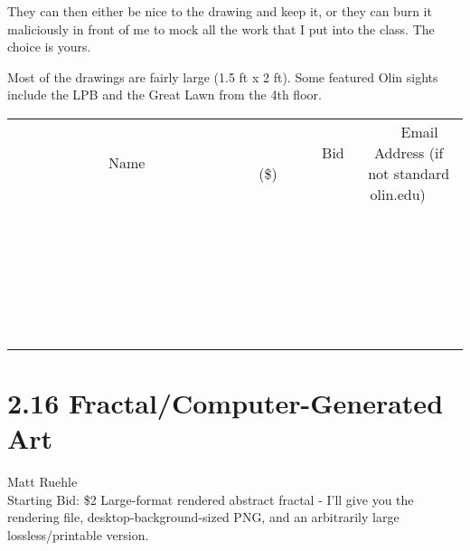 \documentclass[11pt]{article}
\begin{document}
They can then either be nice to the drawing and keep it, or they can burn it maliciously in front of me to mock all the work that I put into the class. The choice is yours.

Most of the drawings are fairly large (1.5 ft x 2 ft). Some featured Olin sights include the LPB and the Great Lawn from the 4th floor.
\\[6ex]
\begin{tabular}{c c c}
~~~~~~~~~~~~~Name~~~~~~~~~~~~~ & ~~~~~~~~~Bid (\$)~~~~~~~~~  & ~~~Email Address (if not standard olin.edu)~~~\\
 & & \\
\hline
 & & \\
\hline
 & & \\
\hline
 & & \\
\hline
 & & \\
\hline
 & & \\
\hline
 & & \\
\hline
 & & \\
\hline
 & & \\
\hline
 & & \\
\hline
 & & \\
\hline
 & & \\
\hline
 & & \\
\hline
 & & \\
\hline
 & & \\
\hline
 & & \\
\hline
 & & \\
\hline
 & & \\
\hline
 & & \\
\hline
 & & \\
\hline
 & & \\
\hline
 & & \\
\hline
 & & \\
\hline
 & & \\
\hline
 & & \\
\hline
 & & \\
\hline
\end{tabular}
\newpage
\section*{2.16 Fractal/Computer-Generated Art}
Matt Ruehle
\\
Starting Bid: \$2
\newline
Large-format rendered abstract fractal - I'll give you the rendering file, desktop-background-sized PNG, and an arbitrarily large lossless/printable version.
\end{document}
